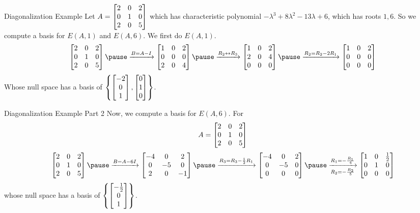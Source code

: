 \documentclass[xcoler=dvipsnames, aspectratio=169]{beamer}
\begin{document}
    \begin{frame}{Diagonalization Example}
        Let $A=\begin{bmatrix}
            2 & 0 & 2\\
            0 & 1 & 0\\
            2 & 0 & 5
        \end{bmatrix}$ which has characteristic polynomial $-\lambda^3+8\lambda^2-13\lambda+6$, which has roots
        $1,6$. So we compute a basis for $E(A,1)$ and $E(A,6)$. We first do $E(A,1)$.
        \[
            \bMat{
                2 & 0 & 2\\
                0 & 1 & 0\\
                2 & 0 & 5
            }\pause\xrightarrow{B=A-I}\bMat{
                1 & 0 & 2\\
                0 & 0 & 0\\
                2 & 0 & 4
            }\pause\xrightarrow{R_2\leftrightarrow R_3}\bMat{
                1 & 0 & 2\\
                2 & 0 & 4\\
                0 & 0 & 0
            }\pause\xrightarrow{R_2=R_2-2R_1}\bMat{
                1 & 0 & 2\\
                0 & 0 & 0\\
                0 & 0 & 0
            }
        \]
        Whose null space has a basis of $\left\{\begin{bmatrix}-2\\0\\1\end{bmatrix}, \begin{bmatrix}0\\1\\0\end{bmatrix}\right\}$.
    \end{frame}
    \begin{frame}{Diagonalization Example Part 2}
        Now, we compute a basis for $E(A,6)$. For
        \[
            A = \begin{bmatrix}
                2 & 0 & 2\\
                0 & 1 & 0\\
                2 & 0 & 5
            \end{bmatrix}
        \]\pause
        \[
            \bMat{
                2 & 0 & 2\\
                0 & 1 & 0\\
                2 & 0 & 5
            }\pause\xrightarrow{B=A-6I}\bMat{
                -4 & 0 & 2\\
                0 & -5 & 0\\
                2 & 0 & -1
            }\pause\xrightarrow{R_3=R_3-\frac{1}{2}R_1}\bMat{
                -4 & 0 & 2\\
                0 & -5 & 0\\
                0 & 0 & 0
            }\pause\xrightarrow[R_2=-\frac{R_2}{5}]{R_1=-\frac{R_1}{4}}\bMat{
                1 & 0 & \frac{1}{2}\\
                0 & 1 & 0\\
                0 & 0 & 0
            }
        \]
        whose null space has a basis of $\left\{\begin{bmatrix}-\frac{1}{2}\\0\\1\end{bmatrix}\right\}$.
    \end{frame}
\end{document}
